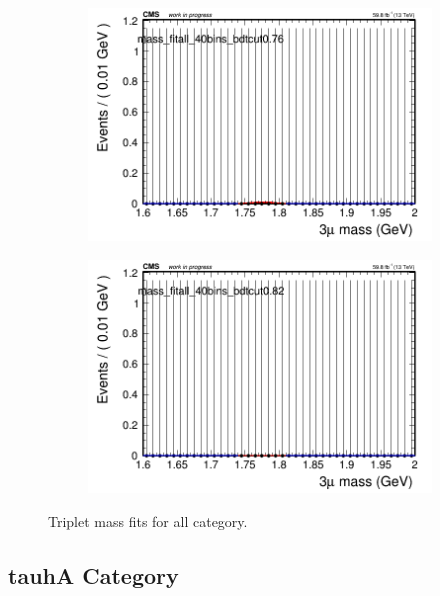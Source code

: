 \begin{figure}[H]
\begin{subfigure}{0.2\textwidth}
        \caption{}
    \end{subfigure}
    \begin{subfigure}{0.2\textwidth}
        \includegraphics[width=\textwidth]{power_law/plots/all/massfit_all_40bins_bdtcut0.76.png}
        \caption{}
    \end{subfigure}
    \begin{subfigure}{0.2\textwidth}
        \includegraphics[width=\textwidth]{power_law/plots/all/massfit_all_40bins_bdtcut0.82.png}
        \caption{}
    \end{subfigure}
    \caption{Triplet mass fits for all category.}
    \label{fig:powerlawall}
\end{figure}

\subsection{tauhA Category}
\label{sec:powerlawtauhA}

